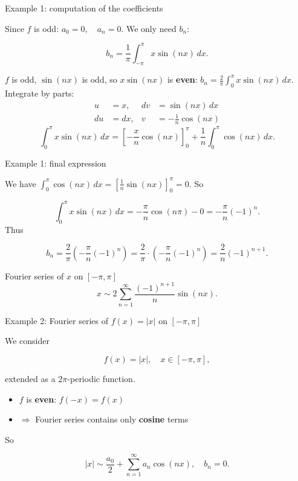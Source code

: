 \documentclass[aspectratio=169]{beamer}
\begin{document}
\begin{frame}{Example 1: computation of the coefficients}

Since $f$ is odd:
$
a_0 = 0, \quad a_n = 0.
$
\pause
We only need $b_n$:

\[
b_n = \frac{1}{\pi}\int_{-\pi}^{\pi} x \sin(nx)\,dx.
\]

$f$ is odd, $\sin(nx)$ is odd, so $x\sin(nx)$ is \textbf{even}:
$
b_n = \frac{2}{\pi}\int_{0}^{\pi} x \sin(nx)\,dx.
$
\pause
Integrate by parts:
\[
\begin{aligned}
u &= x, & dv &= \sin(nx)\,dx \\
du &= dx, & v &= -\frac{1}{n}\cos(nx)
\end{aligned}
\]
\pause
\[
\int_{0}^{\pi} x \sin(nx)\,dx
=
\left[-\frac{x}{n}\cos(nx)\right]_{0}^{\pi}
+ \frac{1}{n}\int_{0}^{\pi}\cos(nx)\,dx.
\]

\end{frame}

\begin{frame}{Example 1: final expression}

We have $
\int_{0}^{\pi}\cos(nx)\,dx
= \left[\frac{1}{n}\sin(nx)\right]_{0}^{\pi}=0.
$
\pause
So

$$
\int_{0}^{\pi} x \sin(nx)\,dx
= -\frac{\pi}{n}\cos(n\pi) - 0
= -\frac{\pi}{n}(-1)^n.
$$
\pause
Thus

\[
b_n = \frac{2}{\pi}\left(-\frac{\pi}{n}(-1)^n\right)
= \frac{2}{\pi}\cdot\left(-\frac{\pi}{n}(-1)^n\right)
= \frac{2}{n}(-1)^{n+1}.
\]
\pause
\begin{block}{Fourier series of $x$ on $[-\pi,\pi]$}
\[
x \sim 2\sum_{n=1}^{\infty} \frac{(-1)^{n+1}}{n}\sin(nx).
\]
\end{block}

\end{frame}

\begin{frame}{Example 2: Fourier series of $f(x)=|x|$ on $[-\pi,\pi]$}

We consider

\[
f(x)=|x|,\quad x\in[-\pi,\pi],
\]

extended as a $2\pi$-periodic function.
\pause
\begin{itemize}
    \item $f$ is \textbf{even}: $f(-x)=f(x)$
    \item $\Rightarrow$ Fourier series contains only \textbf{cosine} terms
\end{itemize}

So

\[
|x| \sim \frac{a_0}{2} + \sum_{n=1}^{\infty} a_n \cos(nx),
\quad b_n = 0.
\]

\end{frame}
\end{document}
